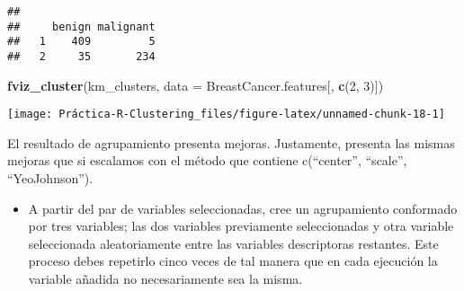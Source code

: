 \documentclass[
]{article}
\newenvironment{Shaded}{\begin{snugshade}}{\end{snugshade}}
\newcommand{\CommentTok}[1]{\textcolor[rgb]{0.56,0.35,0.01}{\textit{#1}}}
\newcommand{\DataTypeTok}[1]{\textcolor[rgb]{0.13,0.29,0.53}{#1}}
\newcommand{\DecValTok}[1]{\textcolor[rgb]{0.00,0.00,0.81}{#1}}
\newcommand{\KeywordTok}[1]{\textcolor[rgb]{0.13,0.29,0.53}{\textbf{#1}}}
\newcommand{\NormalTok}[1]{#1}
\newcommand{\OperatorTok}[1]{\textcolor[rgb]{0.81,0.36,0.00}{\textbf{#1}}}
\newcommand{\StringTok}[1]{\textcolor[rgb]{0.31,0.60,0.02}{#1}}
\providecommand{\tightlist}{%
  \setlength{\itemsep}{0pt}\setlength{\parskip}{0pt}}
\begin{document}
\begin{Shaded}
\end{Shaded}

\begin{verbatim}
##    
##     benign malignant
##   1    409         5
##   2     35       234
\end{verbatim}

\begin{Shaded}
\begin{Highlighting}[]
\KeywordTok{fviz_cluster}\NormalTok{(km_clusters, }\DataTypeTok{data =}\NormalTok{ BreastCancer.features[, }\KeywordTok{c}\NormalTok{(}\DecValTok{2}\NormalTok{, }\DecValTok{3}\NormalTok{)])}
\end{Highlighting}
\end{Shaded}

\begin{center}\texttt{[image: Práctica-R-Clustering\_files/figure-latex/unnamed-chunk-18-1]} \end{center}

El resultado de agrupamiento presenta mejoras. Justamente, presenta las
mismas mejoras que si escalamos con el método que contiene c(``center'',
``scale'', ``YeoJohnson'').

\begin{itemize}
\tightlist
\item
  A partir del par de variables seleccionadas, cree un agrupamiento
  conformado por tres variables; las dos variables previamente
  seleccionadas y otra variable seleccionada aleatoriamente entre las
  variables descriptoras restantes. Este proceso debes repetirlo cinco
  veces de tal manera que en cada ejecución la variable añadida no
  necesariamente sea la misma.
\end{itemize}
\end{document}

